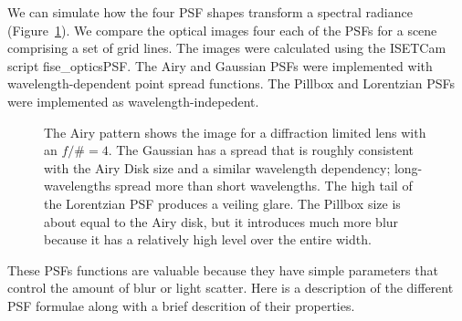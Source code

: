 \documentclass[
  letterpaper,
]{book}
\begin{document}
We can simulate how the four PSF shapes transform a spectral radiance
(Figure~\ref{fig-psf-image}). We compare the optical images four each of
the PSFs for a scene comprising a set of grid lines. The images were
calculated using the ISETCam script fise\_opticsPSF. The Airy and
Gaussian PSFs were implemented with wavelength-dependent point spread
functions. The Pillbox and Lorentzian PSFs were implemented as
wavelength-indepedent.

\begin{figure}


\caption{\label{fig-psf-image}The Airy pattern shows the image for a
diffraction limited lens with an \(f/\# =4\). The Gaussian has a spread
that is roughly consistent with the Airy Disk size and a similar
wavelength dependency; long-wavelengths spread more than short
wavelengths. The high tail of the Lorentzian PSF produces a veiling
glare. The Pillbox size is about equal to the Airy disk, but it
introduces much more blur because it has a relatively high level over
the entire width.}

\end{figure}%

These PSFs functions are valuable because they have simple parameters
that control the amount of blur or light scatter. Here is a description
of the different PSF formulae along with a brief descrition of their
properties.
\end{document}
